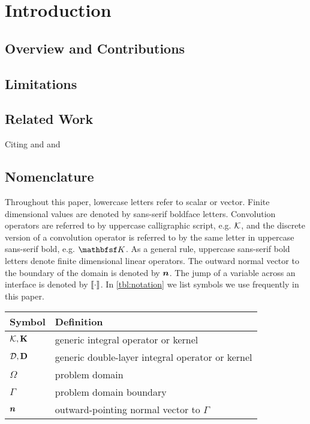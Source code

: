\section{Introduction\label{sec:intro}}
\lipsum

\subsection{Overview and Contributions\label{sec:overview}}
\subsection{Limitations\label{sec:limit}}
\subsection{Related Work\label{sec:related}}
Citing \cite{lamport1994} and \citet{lamport1994} and \citeauthor{lamport1994}
\subsection{Nomenclature\label{sec:notation}}
Throughout this paper, lowercase letters refer to scalar or vector.
Finite dimensional values are denoted by sans-serif boldface letters.
Convolution operators are referred to by uppercase calligraphic
script, e.g. $\mathcal {K}$, and the discrete version of a convolution
operator is referred to by the same letter in uppercase sans-serif
bold, e.g. $\convd{K}$.
As a general rule, uppercase sans-serif bold letters denote finite
dimensional linear operators.
The outward normal vector to the boundary of the domain is denoted by
$\bm {n}$.
The jump of a variable across an interface is denoted by
$\llbracket \cdot \rrbracket$. In \cref{tbl:notation} we list symbols we use frequently
in this paper.

\begin{table}[!bht]
  \centering
  \begin{tabular}{
      >{\centering\small}p{.1\linewidth} >{\small}p{.6\linewidth}  %
    }\toprule
    Symbol                 & Definition                                       \\\midrule
    $\mathcal {K}, \mathbf {K}$  & generic integral operator or kernel              \\
    $\mathcal {D}, \mathbf {D}$  & generic double-layer integral operator or kernel \\
    $\Omega$               & problem domain                                   \\
    $\Gamma$               & problem domain boundary                          \\
    $\bm {n}$           & outward-pointing normal vector to $\Gamma$       \\
    \bottomrule
  \end{tabular}
\end{table}

